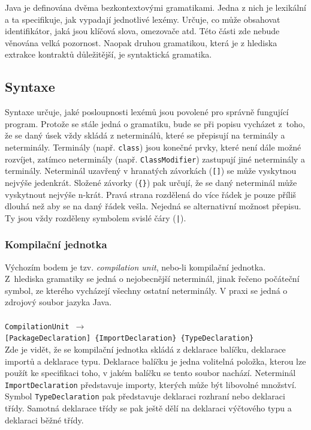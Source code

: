 		Java je definována dvěma bezkontextovými gramatikami. Jedna z nich je lexikální a ta specifikuje, jak vypadají jednotlivé lexémy. Určuje, co může obsahovat identifikátor, jaká jsou klíčová slova, omezovače atd. Této části zde nebude věnována velká pozornost. Naopak druhou gramatikou, která je z hlediska extrakce kontraktů důležitější, je syntaktická gramatika.
		 
		\subsection{Syntaxe}
			Syntaxe určuje, jaké posloupnosti lexémů jsou povolené pro správně fungující program. Protože se stále jedná o gramatiku, bude se při popisu vycházet z~toho, že se daný úsek vždy skládá z neterminálů, které se přepisují na terminály a neterminály. Terminály (např. \texttt{\textcolor{pblue}{class}}) jsou konečné prvky, které není dále možné rozvíjet, zatímco neterminály (např. \texttt{ClassModifier}) zastupují jiné neterminály a terminály. Neterminál uzavřený v hranatých závorkách (\texttt{[]}) se může vyskytnou nejvýše jedenkrát. Složené závorky (\texttt{\{\}}) pak určují, že se daný neterminál může vyskytnout nejvýše n-krát. Pravá strana rozdělená do více řádek je pouze příliš dlouhá než aby se na daný řádek vešla. Nejedná se alternativní možnost přepisu. Ty jsou vždy rozděleny symbolem svislé čáry (\texttt{|}).
			
			\subsubsection{Kompilační jednotka}	
				Výchozím bodem je tzv. \emph{compilation unit}, nebo-li kompilační jednotka. Z~hlediska gramatiky se jedná o nejobecnější neterminál, jinak řečeno počáteční symbol, ze kterého vycházejí všechny ostatní neterminály. V praxi se jedná o zdrojový soubor jazyka Java.\\\\
				\- \- \- \- \- \- \texttt{CompilationUnit $\rightarrow$}\\
				\- \- \- \- \- \- \- \- \- \- \- \- \texttt{[PackageDeclaration] \{ImportDeclaration\} \{TypeDeclaration\}}\\
				
				Zde je vidět, že se kompilační jednotka skládá z deklarace balíčku, deklarace importů a deklarace typu. Deklarace balíčku je jedna volitelná položka, kterou lze použít ke specifikaci toho, v jakém balíčku se tento soubor nachází. Neterminál \texttt{ImportDeclaration} představuje importy, kterých může být libovolné množství. Symbol \texttt{TypeDeclaration} pak představuje deklaraci rozhraní nebo deklaraci třídy. Samotná deklarace třídy se pak ještě dělí na deklaraci výčtového typu a deklaraci běžné třídy.
			
